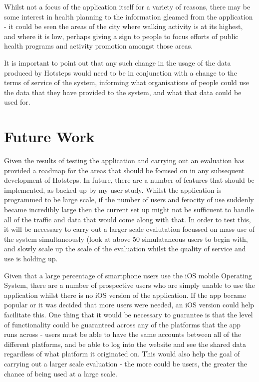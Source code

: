\documentclass{l4proj}
\begin{document}
Whilst not a focus of the application itself for a variety of reasons, there may be some interest in health planning to the information gleamed from the application - it could be seen the areas of the city where walking activity is at its highest, and where it is low, perhaps giving a sign to people to focus efforts of public health programs and activity promotion amongst those areas.

It is important to point out that any such change in the usage of the data produced by Hotsteps would need to be in conjunction with a change to the terms of service of the system, informing what organisations of people could use the data that they have provided to the system, and what that data could be used for.

\section{Future Work}

Given the results of testing the application and carrying out an evaluation has provided a roadmap for the areas that should be focused on in any subsequent development of Hotsteps. In future, there are a number of features that should be implemented, as backed up by my user study. Whilst the application is programmed to be large scale, if the number of users and ferocity of use suddenly became incredibly large then the current set up might not be sufficuent to handle all of the traffic and data that would come along with that. In order to test this, it will be necessary to carry out a larger scale evalutation focussed on mass use of the system simultaneously (look at above 50 simulataneous users to begin with, and slowly scale up the scale of the evaluation whilst the quality of service and use is holding up.

Given that a large percentage of smartphone users use the iOS mobile Operating System, there are a number of prospective users who are simply unable to use the application whilst there is no iOS version of the application. If the app became popular or it was decided that more users were needed, an iOS version could help facilitate this. One thing that it would be necessary to guarantee is that the level of functionality could be guaranteed across any of the platforms that the app runs across - users must be able to have the same accounts between all of the different platforms, and be able to log into the website and see the shared data regardless of what platform it originated on. This would also help the goal of carrying out a larger scale evaluation - the more could be users, the greater the chance of being used at a large scale.
\end{document}
